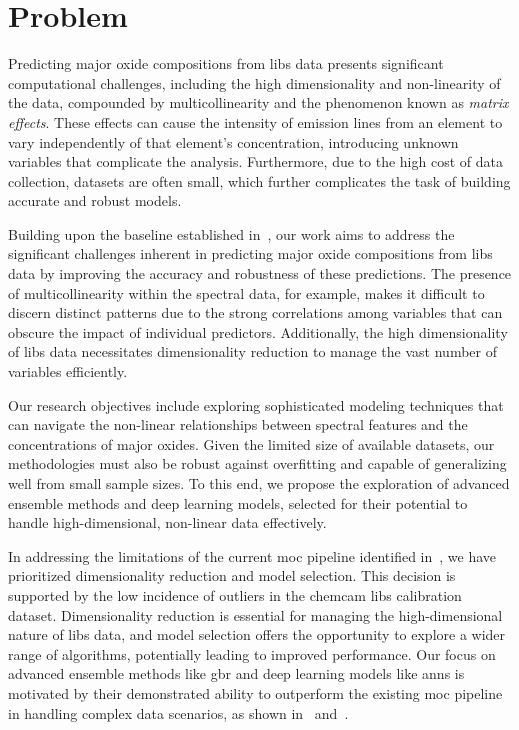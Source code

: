 \section{Problem}
\label{sec:problem_definition}

Predicting major oxide compositions from \gls{libs} data presents significant computational challenges, including the high dimensionality and non-linearity of the data, compounded by multicollinearity and the phenomenon known as \textit{matrix effects}.
These effects can cause the intensity of emission lines from an element to vary independently of that element's concentration, introducing unknown variables that complicate the analysis.
Furthermore, due to the high cost of data collection, datasets are often small, which further complicates the task of building accurate and robust models.

Building upon the baseline established in~\citet{p9_paper}, our work aims to address the significant challenges inherent in predicting major oxide compositions from \gls{libs} data by improving the accuracy and robustness of these predictions.
The presence of multicollinearity within the spectral data, for example, makes it difficult to discern distinct patterns due to the strong correlations among variables that can obscure the impact of individual predictors.
Additionally, the high dimensionality of \gls{libs} data necessitates dimensionality reduction to manage the vast number of variables efficiently.

Our research objectives include exploring sophisticated modeling techniques that can navigate the non-linear relationships between spectral features and the concentrations of major oxides.
Given the limited size of available datasets, our methodologies must also be robust against overfitting and capable of generalizing well from small sample sizes.
To this end, we propose the exploration of advanced ensemble methods and deep learning models, selected for their potential to handle high-dimensional, non-linear data effectively.

In addressing the limitations of the current \gls{moc} pipeline identified in~\citet{p9_paper}, we have prioritized dimensionality reduction and model selection.
This decision is supported by the low incidence of outliers in the \gls{chemcam} \gls{libs} calibration dataset.
Dimensionality reduction is essential for managing the high-dimensional nature of \gls{libs} data, and model selection offers the opportunity to explore a wider range of algorithms, potentially leading to improved performance.
Our focus on advanced ensemble methods like \gls{gbr} and deep learning models like \gls{ann}s is motivated by their demonstrated ability to outperform the existing \gls{moc} pipeline in handling complex data scenarios, as shown in~\citet{p9_paper} and~\citet{andersonPostlandingMajorElement2022}.

